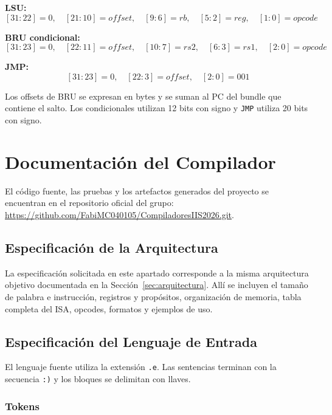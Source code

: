 \documentclass[11pt,letterpaper]{article}
\newcommand{\Repositorio}{https://github.com/FabiMC040105/CompiladoresIIS2026.git}
\begin{document}
\textbf{LSU:}
\[
[31{:}22]=0,\quad [21{:}10]=offset,\quad [9{:}6]=rb,\quad [5{:}2]=reg,\quad [1{:}0]=opcode
\]

\textbf{BRU condicional:}
\[
[31{:}23]=0,\quad [22{:}11]=offset,\quad [10{:}7]=rs2,\quad [6{:}3]=rs1,\quad [2{:}0]=opcode
\]

\textbf{JMP:}
\[
[31{:}23]=0,\quad [22{:}3]=offset,\quad [2{:}0]=001
\]

Los offsets de BRU se expresan en bytes y se suman al PC del bundle que contiene el salto. Los condicionales utilizan 12 bits con signo y \texttt{JMP} utiliza 20 bits con signo.

\clearpage
\setcounter{section}{7}
\section{Documentación del Compilador}

El código fuente, las pruebas y los artefactos generados del proyecto se encuentran en el repositorio oficial del grupo: \url{\Repositorio}.

\subsection{Especificación de la Arquitectura}

La especificación solicitada en este apartado corresponde a la misma arquitectura objetivo documentada en la Sección~\ref{sec:arquitectura}. Allí se incluyen el tamaño de palabra e instrucción, registros y propósitos, organización de memoria, tabla completa del ISA, opcodes, formatos y ejemplos de uso.

\subsection{Especificación del Lenguaje de Entrada}

El lenguaje fuente utiliza la extensión \texttt{.e}. Las sentencias terminan con la secuencia \texttt{:)} y los bloques se delimitan con llaves.

\subsubsection{Tokens}
\end{document}
